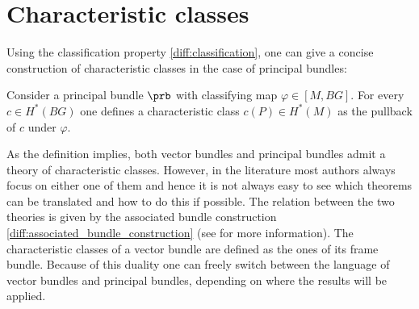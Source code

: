 \section{Characteristic classes}

    Using the classification property \ref{diff:classification}, one can give a concise construction of characteristic classes in the case of principal bundles:
    \begin{construct}
        Consider a principal bundle $\prb$ with classifying map $\varphi\in[M, BG]$. For every $c\in H^*(BG)$ one defines a characteristic class $c(P)\in H^*(M)$ as the pullback of $c$ under $\varphi$.
    \end{construct}

    As the definition implies, both vector bundles and principal bundles admit a theory of characteristic classes. However, in the literature most authors always focus on either one of them and hence it is not always easy to see which theorems can be translated and how to do this if possible. The relation between the two theories is given by the associated bundle construction \ref{diff:associated_bundle_construction} (see \cite{sorensen} for more information). The characteristic classes of a vector bundle are defined as the ones of its frame bundle. Because of this duality one can freely switch between the language of vector bundles and principal bundles, depending on where the results will be applied.

